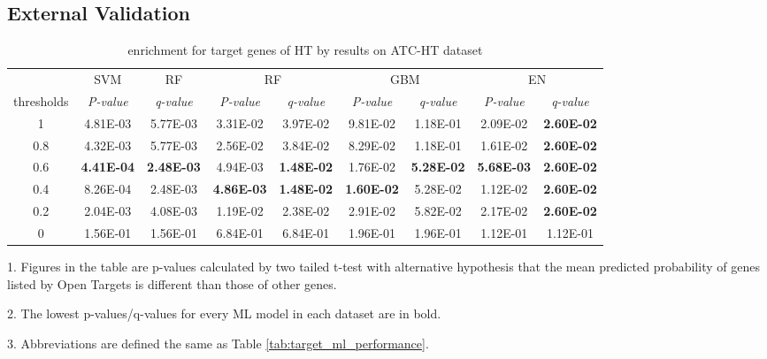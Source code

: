   \subsection{External Validation}  
    \begin{table}[htbp]
      \centering
      \caption{enrichment for target genes of HT by results on ATC-HT dataset}
      \begin{threeparttable}
        \tabcolsep=0.10cm
        \begin{tabular}{ccccccccc}
          \toprule
                & SVM   & RF    & \multicolumn{2}{c}{RF} & \multicolumn{2}{c}{GBM} & \multicolumn{2}{c}{EN} \\
          thresholds & \textit{P-value} & \textit{q-value} & \textit{P-value} & \textit{q-value} & \textit{P-value} & \textit{q-value} & \textit{P-value} & \textit{q-value} \\
          \midrule
          1     & 4.81E-03 & 5.77E-03 & 3.31E-02 & 3.97E-02 & 9.81E-02 & 1.18E-01 & 2.09E-02 & \textbf{2.60E-02} \\
          0.8   & 4.32E-03 & 5.77E-03 & 2.56E-02 & 3.84E-02 & 8.29E-02 & 1.18E-01 & 1.61E-02 & \textbf{2.60E-02} \\
          0.6   & \textbf{4.41E-04} & \textbf{2.48E-03} & 4.94E-03 & \textbf{1.48E-02} & 1.76E-02 & \textbf{5.28E-02} & \textbf{5.68E-03} & \textbf{2.60E-02} \\
          0.4   & 8.26E-04 & 2.48E-03 & \textbf{4.86E-03} & \textbf{1.48E-02} & \textbf{1.60E-02} & 5.28E-02 & 1.12E-02 & \textbf{2.60E-02} \\
          0.2   & 2.04E-03 & 4.08E-03 & 1.19E-02 & 2.38E-02 & 2.91E-02 & 5.82E-02 & 2.17E-02 & \textbf{2.60E-02} \\
          0     & 1.56E-01 & 1.56E-01 & 6.84E-01 & 6.84E-01 & 1.96E-01 & 1.96E-01 & 1.12E-01 & 1.12E-01 \\
          \bottomrule
          \end{tabular}%
          \begin{tablenotes}
            \item 1. Figures in the table are p-values calculated by two tailed t-test with alternative hypothesis that the mean predicted probability of genes listed by Open Targets is different than those of other genes. 
            \item 2. The lowest p-values/q-values for every ML model in each dataset are in bold.
            \item 3. Abbreviations are defined the same as Table \ref{tab:target_ml_performance}.  
          \end{tablenotes}
        \end{threeparttable}
        \label{tab:repurposing_enrichment_ht}%
      \end{table}%

